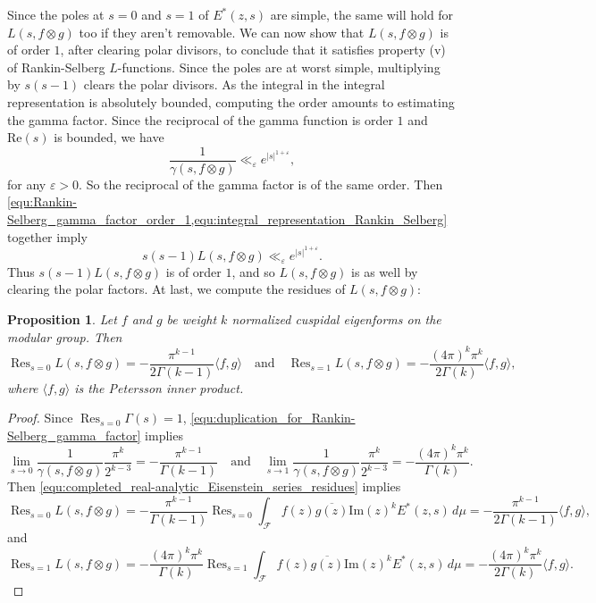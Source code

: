 \documentclass[12pt]{book}
\newtheorem{proposition}{Proposition}[section]
\theoremstyle{definition}\newframedtheorem{method}{Method}
\newcommand{\mc}{\mathcal}
\newcommand{\g}{\gamma}
\newcommand{\G}{\Gamma}
\newcommand{\e}{\varepsilon}
\newcommand{\ox}{\otimes}
\newcommand{\<}{\langle}
\renewcommand{\>}{\rangle}
\newcommand{\conj}{\overline}
\DeclareMathOperator*{\Res}{\mathrm{Res}}
\renewcommand{\Re}{\mathrm{Re}}
\renewcommand{\Im}{\mathrm{Im}}
\begin{document}
      Since the poles at $s = 0$ and $s = 1$ of $E^{\ast}(z,s)$ are simple, the same will hold for $L(s,f \ox g)$ too if they aren't removable. We can now show that $L(s,f \ox g)$ is of order $1$, after clearing polar divisors, to conclude that it satisfies property (v) of Rankin-Selberg $L$-functions. Since the poles are at worst simple, multiplying by $s(s-1)$ clears the polar divisors. As the integral in the integral representation is absolutely bounded, computing the order amounts to estimating the gamma factor. Since the reciprocal of the gamma function is order $1$ and $\Re(s)$ is bounded, we have
      \begin{equation}\label{equ:Rankin-Selberg_gamma_factor_order_1}
        \frac{1}{\g(s,f \ox g)} \ll_{\e} e^{|s|^{1+\e}},
      \end{equation}
      for any $\e > 0$. So the reciprocal of the gamma factor is of the same order. Then \cref{equ:Rankin-Selberg_gamma_factor_order_1,equ:integral_representation_Rankin_Selberg} together imply
      \[
        s(s-1)L(s,f \ox g) \ll_{\e} e^{|s|^{1+\e}}.
      \]
      Thus $s(s-1)L(s,f \ox g)$ is of order $1$, and so $L(s,f \ox g)$ is as well by clearing the polar factors. At last, we compute the residues of $L(s,f \ox g)$:
      \begin{proposition}
        Let $f$ and $g$ be weight $k$ normalized cuspidal eigenforms on the modular group. Then
        \[
          \Res_{s = 0}L(s,f \ox g) = -\frac{\pi^{k-1}}{2\G(k-1)}\<f,g\> \quad \text{and} \quad \Res_{s = 1}L(s,f \ox g) = -\frac{(4\pi)^{k}\pi^{k}}{2\G(k)}\<f,g\>,
        \]
        where $\<f,g\>$ is the Petersson inner product.
      \end{proposition}
      \begin{proof}
        Since $\Res_{s = 0}\G(s) = 1$, \cref{equ:duplication_for_Rankin-Selberg_gamma_factor} implies
        \[
          \lim_{s \to 0}\frac{1}{\g(s,f \ox g)}\frac{\pi^{k}}{2^{k-3}} = -\frac{\pi^{k-1}}{\G(k-1)} \quad \text{and} \quad \lim_{s \to 1}\frac{1}{\g(s,f \ox g)}\frac{\pi^{k}}{2^{k-3}} = -\frac{(4\pi)^{k}\pi^{k}}{\G(k)}.
        \]
        Then \cref{equ:completed_real-analytic_Eisenstein_series_residues} implies
        \[
          \Res_{s = 0}L(s,f \ox g) = -\frac{\pi^{k-1}}{\G(k-1)}\Res_{s = 0}\int_{\mc{F}}f(z)\conj{g(z)}\Im(z)^{k}E^{\ast}(z,s)\,d\mu = -\frac{\pi^{k-1}}{2\G(k-1)}\<f,g\>,
        \]
        and
        \[
          \Res_{s = 1}L(s,f \ox g) = -\frac{(4\pi)^{k}\pi^{k}}{\G(k)}\Res_{s = 1}\int_{\mc{F}}f(z)\conj{g(z)}\Im(z)^{k}E^{\ast}(z,s)\,d\mu = -\frac{(4\pi)^{k}\pi^{k}}{2\G(k)}\<f,g\>.
        \]
      \end{proof}
\end{document}
